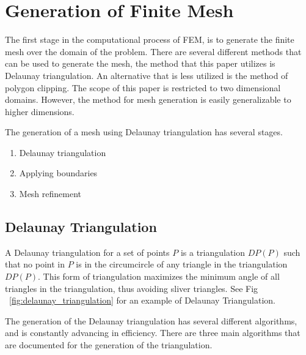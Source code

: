 \documentclass[fem.tex]{subfiles}
\begin{document}
\section{Generation of Finite Mesh}%
\label{sec:generation_of_finite_mesh}

The first stage in the computational process of FEM, is to generate the finite
mesh over the domain of the problem. There are several different methods that
can be used to generate the mesh, the method that this paper utilizes is
Delaunay triangulation. An alternative that is less utilized is the method of
polygon clipping. The scope of this paper is restricted to two
dimensional domains. However, the method for mesh generation is easily
generalizable to higher dimensions.

The generation of a mesh using Delaunay triangulation has several stages.

\begin{enumerate}
  \item Delaunay triangulation
  \item Applying boundaries
  \item Mesh refinement
\end{enumerate}

\subsection{Delaunay Triangulation}%
\label{sub:delaunay_triangulation}

A Delaunay triangulation for a set of points $P$ is a triangulation $DP(P)$
such that no point in $P$ is in the circumcircle of any triangle in the
triangulation $DP(P)$. This form of triangulation maximizes the minimum angle
of all triangles in the triangulation, thus avoiding sliver triangles. See
Fig ~\ref{fig:delaunay_triangulation} for an example of Delaunay Triangulation.

\begin{Figure}
\begin{center}
  \begin{tikzpicture}[scale=0.5]
    
\end{tikzpicture}
\end{center}
\label{fig:delaunay_triangulation}
\end{Figure}

The generation of the Delaunay triangulation has several different algorithms,
and is constantly advancing in efficiency. There are three main algorithms that
are documented for the generation of the triangulation.
\end{document}
